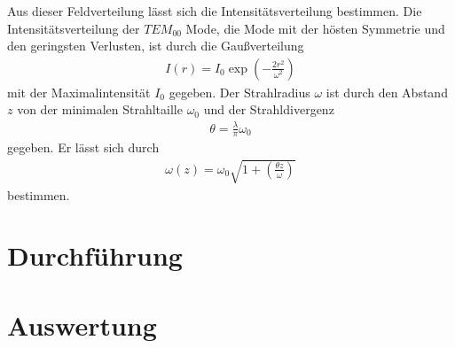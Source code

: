 \documentclass[]{scrartcl}
\begin{document}
Aus dieser Feldverteilung lässt sich die Intensitätsverteilung bestimmen. Die Intensitätsverteilung der $TEM_{00}$ Mode, die Mode mit der hösten Symmetrie und den geringsten Verlusten, ist durch die Gaußverteilung
\begin{align}
 I\left(r\right)=I_0\exp \left(-\frac{2r^2}{\omega^2}\right)
\end{align}
mit der Maximalintensität $I_0$ gegeben. Der Strahlradius $\omega$ ist durch den Abstand $z$ von der minimalen Strahltaille $\omega_0$ und der Strahldivergenz 
\begin{align}
 \theta = \frac{\lambda}{\pi}\omega_0
\end{align}
gegeben. Er lässt sich durch
\begin{align}
 \omega\left(z\right)=\omega_0\sqrt{1+\left(\frac{\theta z}{\omega}\right)}
\end{align}
bestimmen. 
\section{Durchführung}

\section{Auswertung}
\end{document}
